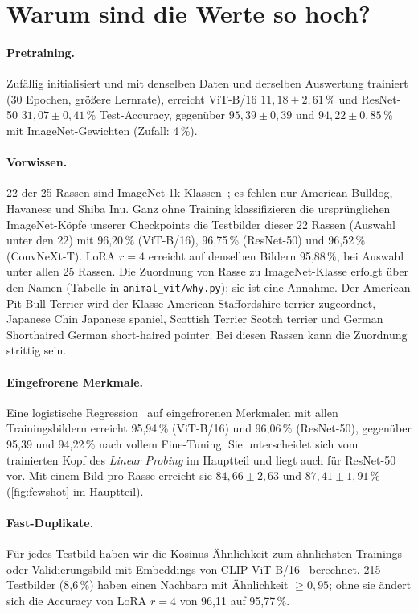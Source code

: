 \section{Warum sind die Werte so hoch?}
\label{sec:why}

\paragraph{Pretraining.} Zufällig initialisiert und mit denselben Daten und derselben Auswertung
trainiert (30 Epochen, größere Lernrate), erreicht ViT-B/16 $11{,}18\pm2{,}61$\,\% und ResNet-50
$31{,}07\pm0{,}41$\,\% Test-Accuracy, gegenüber $95{,}39\pm0{,}39$ und $94{,}22\pm0{,}85$\,\% mit
ImageNet-Gewichten (Zufall: 4\,\%).

\paragraph{Vorwissen.} 22 der 25 Rassen sind ImageNet-1k-Klassen~\cite{russakovsky2015imagenet}; es
fehlen nur American Bulldog, Havanese und Shiba Inu. Ganz ohne Training klassifizieren die
ursprünglichen ImageNet-Köpfe unserer Checkpoints die Testbilder dieser 22 Rassen (Auswahl unter den 22)
mit 96,20\,\% (ViT-B/16), 96,75\,\% (ResNet-50) und 96,52\,\% (ConvNeXt-T). LoRA $r=4$ erreicht auf
denselben Bildern 95,88\,\%, bei Auswahl unter allen 25 Rassen. Die Zuordnung von Rasse zu
ImageNet-Klasse erfolgt über den Namen (Tabelle in \texttt{animal\_vit/why.py}); sie ist eine Annahme. Der
American Pit Bull Terrier wird der Klasse \glqq American Staffordshire terrier\grqq{} zugeordnet, Japanese Chin
\glqq Japanese spaniel\grqq{}, Scottish Terrier \glqq Scotch terrier\grqq{} und German Shorthaired \glqq German short-haired
pointer\grqq{}. Bei diesen Rassen kann die Zuordnung strittig sein.

\paragraph{Eingefrorene Merkmale.} Eine logistische Regression~\cite{pedregosa2011sklearn} auf eingefrorenen Merkmalen mit allen
Trainingsbildern erreicht 95,94\,\% (ViT-B/16) und 96,06\,\% (ResNet-50), gegenüber 95,39 und 94,22\,\%
nach vollem Fine-Tuning. Sie unterscheidet sich vom trainierten Kopf des \emph{Linear Probing} im Hauptteil
und liegt auch für ResNet-50 vor. Mit einem Bild pro Rasse erreicht sie $84{,}66\pm2{,}63$ und
$87{,}41\pm1{,}91$\,\% (\cref{fig:fewshot} im Hauptteil).

\paragraph{Fast-Duplikate.} Für jedes Testbild haben wir die Kosinus-Ähnlichkeit zum ähnlichsten Trainings-
oder Validierungsbild mit Embeddings von CLIP ViT-B/16~\cite{radford2021clip} berechnet. 215 Testbilder
(8,6\,\%) haben einen Nachbarn mit Ähnlichkeit $\geq0{,}95$; ohne sie ändert sich die Accuracy von LoRA
$r=4$ von 96,11 auf 95,77\,\%.

